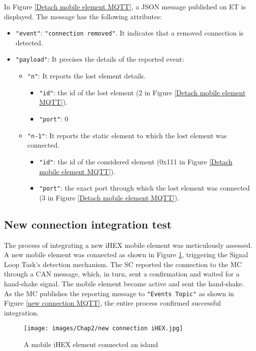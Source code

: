 In Figure \ref{Detach mobile element MQTT}, a JSON message published on ET is displayed. The message has the following attributes:
\begin{itemize}
    \item \texttt{"event"}: \texttt{"connection removed"}. It indicates that a removed connection is detected.
    \item \texttt{"payload"}: It precises the details of the reported event:
    \begin{itemize}
        \item \texttt{"n"}: It reports the lost element details.
        \begin{itemize}
            \item \texttt{"id"}: the id of the lost element (2 in Figure \ref{Detach mobile element MQTT}).
            \item \texttt{"port"}: 0
        \end{itemize}
        \item \texttt{"n-1"}: It reports the static element to which the lost element was connected.
        \begin{itemize}
            \item \texttt{"id"}: the id of the considered element (0x111 in Figure \ref{Detach mobile element MQTT}).
            \item \texttt{"port"}: the exact port through which the lost element was connected (3 in Figure \ref{Detach mobile element MQTT}).
        \end{itemize}
    \end{itemize}
\end{itemize}

\subsection{New connection integration test}
The process of integrating a new iHEX mobile element was meticulously assessed. A new mobile element was connected as shown in Figure \ref{new connection iHEX}, triggering the Signal Loop Task's detection mechanism. The SC reported the connection to the MC through a CAN message, which, in turn, sent a confirmation and waited for a hand-shake signal. The mobile element became active and sent the hand-shake. As the MC publishes the reporting message to \texttt{"Events Topic"} as shown in Figure \ref{new connection MQTT}, the entire process confirmed successful integration.

\begin{figure}[H]
\begin{center}
\texttt{[image: images/Chap2/new connection iHEX.jpg]}\\
\caption{A mobile iHEX element connected an island}
\label{new connection iHEX}
\end{center}
\end{figure}

